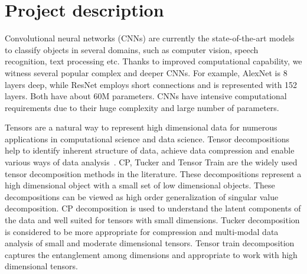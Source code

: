 \documentclass[11pt]{article}
\begin{document}
\section{Project description}

Convolutional neural networks  (CNNs) are currently the state-of-the-art models to classify objects in several domains, such as computer vision, speech recognition, text processing etc. Thanks to improved computational capability, we witness several popular complex and deeper CNNs. For example, AlexNet is 8 layers deep, while ResNet employs short connections and is represented with 152 layers. Both have about 60M parameters. CNNs have intensive computational requirements due to their huge complexity and large number of parameters. 

Tensors are a natural way to represent high dimensional data for numerous applications in computational science and data science. Tensor decompositions help to identify inherent structure of data, achieve data compression and enable various ways of data analysis~\cite{KB-SIAMReview2009}. CP, Tucker and Tensor Train are the widely used tensor decomposition methods in the literature. These decompositions represent a high dimensional object with a small set of low dimensional objects. These decompositions can be viewed as high order generalization of singular value decomposition. CP decomposition is used to understand the latent components of the data and well suited for tensors with small dimensions. Tucker decomposition is considered to be more appropriate for compression and multi-modal data analysis of small and moderate dimensional tensors. Tensor train decomposition captures the entanglement among dimensions and appropriate to work with high dimensional tensors.
\end{document}
